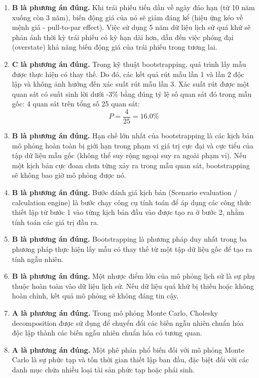 \begin{enumerate}
	\item \textbf{B là phương án đúng.} Khi trái phiếu tiến dần về ngày đáo hạn (từ 10 năm xuống còn 3 năm), biến động giá của nó sẽ giảm đáng kể (hiệu ứng kéo về mệnh giá - pull-to-par effect). Việc sử dụng 5 năm dữ liệu lịch sử quá khứ sẽ phản ánh thời kỳ trái phiếu có kỳ hạn dài hơn, dẫn đến việc phóng đại (overstate) khả năng biến động giá của trái phiếu trong tương lai.
	
	\item \textbf{C là phương án đúng.} Trong kỹ thuật bootstrapping, quá trình lấy mẫu được thực hiện có thay thế. Do đó, các kết quả rút mẫu lần 1 và lần 2 độc lập và không ảnh hưởng đến xác suất rút mẫu lần 3. Xác suất rút được một quan sát có suất sinh lời dưới -3\% bằng đúng tỷ lệ số quan sát đó trong mẫu gốc: 4 quan sát trên tổng số 25 quan sát:
	      \[
	      P = \frac{4}{25} = 16.0\%
	      \]
	      
	\item \textbf{B là phương án đúng.} Hạn chế lớn nhất của bootstrapping là các kịch bản mô phỏng hoàn toàn bị giới hạn trong phạm vi giá trị cực đại và cực tiểu của tập dữ liệu mẫu gốc (không thể suy rộng ngoại suy ra ngoài phạm vi). Nếu một kịch bản cực đoan chưa từng xảy ra trong mẫu quan sát, bootstrapping sẽ không bao giờ mô phỏng được nó.
	
	\item \textbf{B là phương án đúng.} Bước đánh giá kịch bản (Scenario evaluation / calculation engine) là bước chạy công cụ tính toán để áp dụng các công thức thiết lập từ bước 1 vào từng kịch bản đầu vào được tạo ra ở bước 2, nhằm tính toán các giá trị đầu ra.
	
	\item \textbf{B là phương án đúng.} Bootstrapping là phương pháp duy nhất trong ba phương pháp thực hiện lấy mẫu có thay thế từ một tập dữ liệu gốc để tạo ra tính ngẫu nhiên.
	
	\item \textbf{B là phương án đúng.} Một nhược điểm lớn của mô phỏng lịch sử là sự phụ thuộc hoàn toàn vào dữ liệu lịch sử. Nếu dữ liệu quá khứ bị thiếu hoặc không hoàn chỉnh, kết quả mô phỏng sẽ không đáng tin cậy.
	
	\item \textbf{A là phương án đúng.} Trong mô phỏng Monte Carlo, Cholesky decomposition được sử dụng để chuyển đổi các biến ngẫu nhiên chuẩn hóa độc lập thành các biến ngẫu nhiên chuẩn hóa có tương quan.
	
	\item \textbf{A là phương án đúng.} Một phê phán phổ biến đối với mô phỏng Monte Carlo là sự phức tạp và tốn thời gian thiết lập ban đầu, đặc biệt đối với các danh mục chứa nhiều loại tài sản phức tạp hoặc phái sinh.
\end{enumerate}

